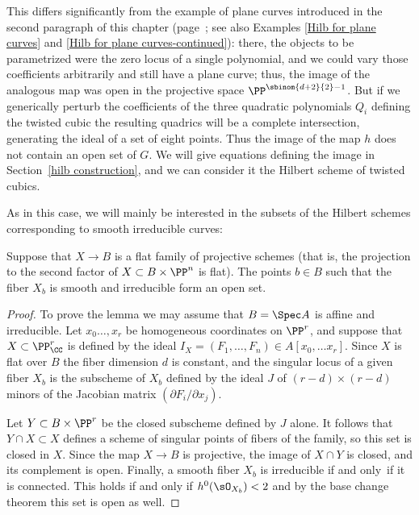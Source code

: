 This differs significantly from
the example of plane curves introduced in the second paragraph of this chapter (page~\pageref{ModuliChapter}; see also Examples \ref{Hilb for plane curves} and \ref{Hilb for plane curves-continued}):
there, the objects to be parametrized were the
zero locus of a single polynomial, and we could vary those coefficients
arbitrarily and still have a plane curve; thus, the image of the analogous
map was open in the projective space $\PP^{\sbinom{d+2}{2}-1}$. But if
we generically
perturb the coefficients of the three quadratic polynomials $Q_i$
defining the twisted cubic the resulting quadrics will
be a complete intersection, generating
 the ideal of a set of eight points. Thus the image of the map $h$
 does not contain an open set of $G$.
We will give equations defining the image in Section~\ref{hilb
construction}, and we can consider it
the Hilbert scheme of twisted cubics.

As in this case, we will mainly be   interested in the subsets of the
Hilbert schemes corresponding to smooth irreducible curves:

\begin{lemma}
\label{smooth is open}
Suppose that $X \to B$ is a flat family of projective schemes (that is,
%
the projection to the second factor of
$X\subset B\times \PP^n$  is flat). The points $b\in B$ such that the
fiber $X_b$ is smooth and irreducible form an open set.
\end{lemma}

\begin{proof}
To prove the
lemma we may assume that $B = \Spec A$ is affine and
irreducible. Let $x_{0}\dots, x_{r}$ be homogeneous coordinates
on $\PP^{r}$, and suppose that
$X\subset \PP^{r}_{\CC}$ is defined by the ideal $I_{X} = (F_{1}, \dots,
F_{n}) \in A[x_{0}, \dots x_{r}]$.
Since $X$ is flat over $B$ the fiber dimension $d$ is constant, and the
singular locus
of a given fiber $X_{b}$ is  the subscheme of $X_{b}$ defined by the
ideal $J$ of
$(r-d)\times (r-d)$ minors of the Jacobian matrix $(\partial
F_{i}/\partial x_{j})$.

Let $Y\subset B\times \PP^{r}$ be the closed subscheme defined by $J$
alone.
It follows that $Y\cap X \subset X$ defines a scheme of singular points
of fibers of the family, so this set is closed
in $X$.
Since the map $X \to B$ is projective, the image of $X\cap Y$ is closed,
and its complement is open.
 Finally, a smooth fiber $X_b$ is irreducible if and only~if it is
 connected. This holds if and only if $h^0(\sO_{X_b}) <2$ and by the
base change theorem
%
\cite[Theorem 12.11]{Hartshorne1977} this set
 is open as well.
\end{proof}

